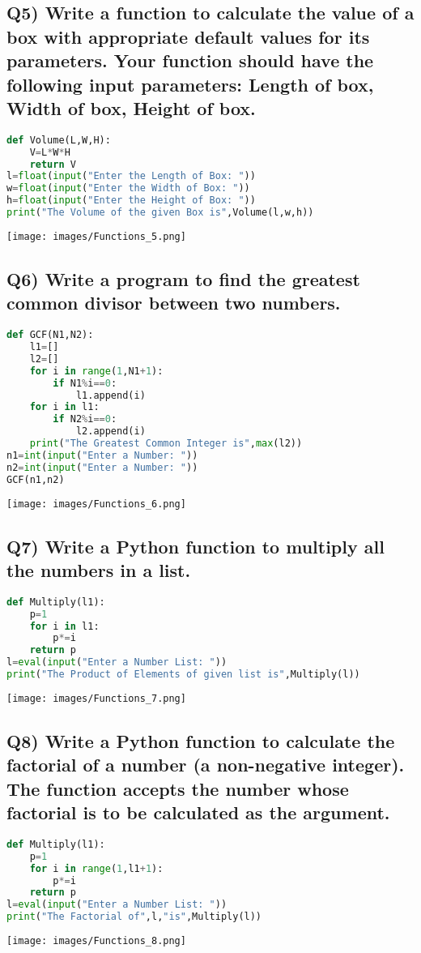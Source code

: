 \documentclass{article}
\begin{document}
\subsection*{Q5) Write a function to calculate the value of a box with appropriate default values for its parameters. Your function should have the following input parameters: Length of box, Width of box, Height of box.}
\begin{lstlisting}[language=Python]
def Volume(L,W,H):
    V=L*W*H
    return V
l=float(input("Enter the Length of Box: "))
w=float(input("Enter the Width of Box: "))
h=float(input("Enter the Height of Box: "))
print("The Volume of the given Box is",Volume(l,w,h))
\end{lstlisting}
\texttt{[image: images/Functions\_5.png]}

\subsection*{Q6) Write a program to find the greatest common divisor between two numbers.}
\begin{lstlisting}[language=Python]
def GCF(N1,N2):
    l1=[]
    l2=[]
    for i in range(1,N1+1):
        if N1%i==0:
            l1.append(i)
    for i in l1:
        if N2%i==0:
            l2.append(i)
    print("The Greatest Common Integer is",max(l2))
n1=int(input("Enter a Number: "))
n2=int(input("Enter a Number: "))
GCF(n1,n2)
\end{lstlisting}
\texttt{[image: images/Functions\_6.png]}

\subsection*{Q7) Write a Python function to multiply all the numbers in a list.}
\begin{lstlisting}[language=Python]
def Multiply(l1):
    p=1
    for i in l1:
        p*=i
    return p
l=eval(input("Enter a Number List: "))
print("The Product of Elements of given list is",Multiply(l))
\end{lstlisting}
\texttt{[image: images/Functions\_7.png]}

\subsection*{Q8) Write a Python function to calculate the factorial of a number (a non-negative integer). The function accepts the number whose factorial is to be calculated as the argument.}
\begin{lstlisting}[language=Python]
def Multiply(l1):
    p=1
    for i in range(1,l1+1):
        p*=i
    return p
l=eval(input("Enter a Number List: "))
print("The Factorial of",l,"is",Multiply(l))
\end{lstlisting}
\texttt{[image: images/Functions\_8.png]}
\end{document}

